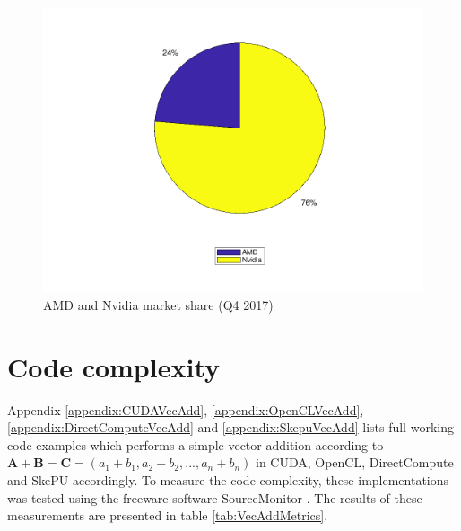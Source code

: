 \begin{figure}[H]
    \centering
    \includegraphics[width=.8\textwidth]{Results/Figs/GPUMarketShare.png}
    \caption{AMD and Nvidia market share (Q4 2017)}
    \label{fig:GPUMarketShare}
\end{figure}

\section{Code complexity}

Appendix \ref{appendix:CUDAVecAdd}, \ref{appendix:OpenCLVecAdd}, \ref{appendix:DirectComputeVecAdd} and \ref{appendix:SkepuVecAdd} lists full working code examples which performs a simple vector addition according to 
$\boldsymbol A + \boldsymbol B = \boldsymbol C = (a_1 + b_1, a_2 + b_2, ... , a_n +b_n)$ in CUDA, OpenCL, DirectCompute and SkePU accordingly. To measure the code complexity, these implementations was tested using the freeware software SourceMonitor \cite{SourceMonitor}. The results of these measurements are presented in table \ref{tab:VecAddMetrics}.


